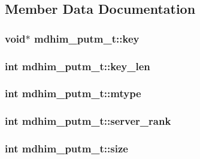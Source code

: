 \subsection{Member Data Documentation}
\hypertarget{structmdhim__putm__t_a6b5ee783b09f0039b09597e25005396e}{
\subsubsection[{key}]{\setlength{\rightskip}{0pt plus 5cm}void$\ast$ mdhim\-\_\-putm\-\_\-t\-::key}}\label{structmdhim__putm__t_a6b5ee783b09f0039b09597e25005396e}
\hypertarget{structmdhim__putm__t_afbac7bbcd98d8489c502fbd6599964a0}{
\subsubsection[{key\-\_\-len}]{\setlength{\rightskip}{0pt plus 5cm}int mdhim\-\_\-putm\-\_\-t\-::key\-\_\-len}}\label{structmdhim__putm__t_afbac7bbcd98d8489c502fbd6599964a0}
\hypertarget{structmdhim__putm__t_a632ccc930561029cfbbb28ec2b9929a4}{
\subsubsection[{mtype}]{\setlength{\rightskip}{0pt plus 5cm}int mdhim\-\_\-putm\-\_\-t\-::mtype}}\label{structmdhim__putm__t_a632ccc930561029cfbbb28ec2b9929a4}
\hypertarget{structmdhim__putm__t_ad51fbdc39b6f3f8951b4e87a4f57e3bd}{
\subsubsection[{server\-\_\-rank}]{\setlength{\rightskip}{0pt plus 5cm}int mdhim\-\_\-putm\-\_\-t\-::server\-\_\-rank}}\label{structmdhim__putm__t_ad51fbdc39b6f3f8951b4e87a4f57e3bd}
\hypertarget{structmdhim__putm__t_aa12607649b47c8489b4a79039b69c629}{
\subsubsection[{size}]{\setlength{\rightskip}{0pt plus 5cm}int mdhim\-\_\-putm\-\_\-t\-::size}}\label{structmdhim__putm__t_aa12607649b47c8489b4a79039b69c629}
